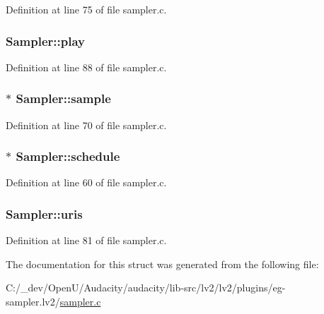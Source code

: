 Definition at line 75 of file sampler.\+c.

\subsubsection[{\texorpdfstring{play}{play}}]{ Sampler\+::play}\hypertarget{struct_sampler_aea4455563653ba8248e3b688bcb8427b}{}\label{struct_sampler_aea4455563653ba8248e3b688bcb8427b}


Definition at line 88 of file sampler.\+c.

\subsubsection[{\texorpdfstring{sample}{sample}}]{$\ast$ Sampler\+::sample}\hypertarget{struct_sampler_a99dbeeb8d3bd007739da9d426eb3f39d}{}\label{struct_sampler_a99dbeeb8d3bd007739da9d426eb3f39d}


Definition at line 70 of file sampler.\+c.

\subsubsection[{\texorpdfstring{schedule}{schedule}}]{$\ast$ Sampler\+::schedule}\hypertarget{struct_sampler_ad2e8bda45d0ae82f09548b287c0a8689}{}\label{struct_sampler_ad2e8bda45d0ae82f09548b287c0a8689}


Definition at line 60 of file sampler.\+c.

\subsubsection[{\texorpdfstring{uris}{uris}}]{ Sampler\+::uris}\hypertarget{struct_sampler_a89f9fbca57ad4ce3fc7fcba1cb938a99}{}\label{struct_sampler_a89f9fbca57ad4ce3fc7fcba1cb938a99}


Definition at line 81 of file sampler.\+c.



The documentation for this struct was generated from the following file\+:\begin{DoxyCompactItemize}
\item 
C\+:/\+\_\+dev/\+Open\+U/\+Audacity/audacity/lib-\/src/lv2/lv2/plugins/eg-\/sampler.\+lv2/\hyperlink{lv2_2lv2_2plugins_2eg-sampler_8lv2_2sampler_8c}{sampler.\+c}\end{DoxyCompactItemize}
